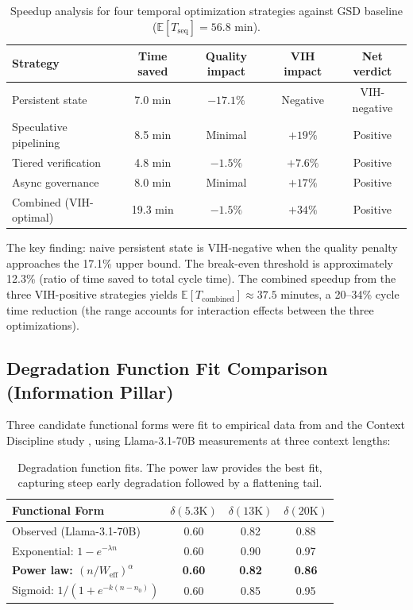 \documentclass[11pt, a4paper, logo, copyright]{googledeepmind}
\newcommand{\E}{\mathbb{E}}
\begin{document}
\begin{appendices}
\begin{table}[htbp]
\centering
\caption{Speedup analysis for four temporal optimization strategies against GSD baseline ($\E[T_{\mathrm{seq}}] = 56.8$ min).}
\label{tab:ext-speedup}
\begin{tabular}{lcccc}
\toprule
\textbf{Strategy} & \textbf{Time saved} & \textbf{Quality impact} & \textbf{VIH impact} & \textbf{Net verdict} \\
\midrule
Persistent state & 7.0 min & $-17.1\%$ & Negative & VIH-negative \\
Speculative pipelining & 8.5 min & Minimal & $+19\%$ & Positive \\
Tiered verification & 4.8 min & $-1.5\%$ & $+7.6\%$ & Positive \\
Async governance & 8.0 min & Minimal & $+17\%$ & Positive \\
\midrule
Combined (VIH-optimal) & 19.3 min & $-1.5\%$ & $+34\%$ & Positive \\
\bottomrule
\end{tabular}
\end{table}

The key finding: naive persistent state is VIH-negative when the quality penalty
approaches the 17.1\% upper bound. The break-even threshold is approximately
12.3\% (ratio of time saved to total cycle time). The combined speedup from the
three VIH-positive strategies yields $\E[T_{\mathrm{combined}}] \approx 37.5$ minutes,
a 20--34\% cycle time reduction (the range accounts for interaction effects between
the three optimizations).


\subsection{Degradation Function Fit Comparison (Information Pillar)}
\label{app:degradation-fit}

Three candidate functional forms were fit to empirical data from
\citet{du2025context} and the Context Discipline study \citep{contextdiscipline2025},
using Llama-3.1-70B measurements at three context lengths:

\begin{table}[htbp]
\centering
\caption{Degradation function fits. The power law provides the best fit, capturing steep early degradation followed by a flattening tail.}
\label{tab:ext-degradation}
\small
\begin{tabular}{lccc}
\toprule
\textbf{Functional Form} & $\delta(5.3\text{K})$ & $\delta(13\text{K})$ & $\delta(20\text{K})$ \\
\midrule
Observed (Llama-3.1-70B) & 0.60 & 0.82 & 0.88 \\
Exponential: $1 - e^{-\lambda n}$ & 0.60 & 0.90 & 0.97 \\
\textbf{Power law: $(n/W_{\text{eff}})^\alpha$} & \textbf{0.60} & \textbf{0.82} & \textbf{0.86} \\
Sigmoid: $1/(1+e^{-k(n-n_0)})$ & 0.60 & 0.85 & 0.95 \\
\bottomrule
\end{tabular}
\end{table}


\end{appendices}
\end{document}
